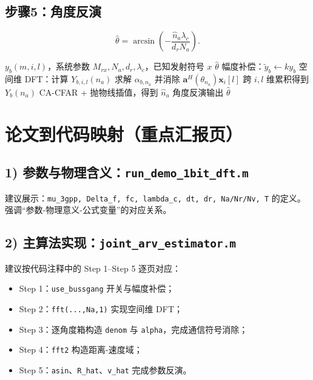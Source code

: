 \documentclass[12pt,a4paper]{ctexart}
\begin{document}
\subsection{步骤5：角度反演}
\begin{equation}
  \hat\theta = \arcsin\!\left(-\frac{\hat n_a\lambda_c}{d_r N_a}\right).
\end{equation}

\begin{algorithm}[H]
\caption{单比特空间维 DFT 角度估计流程}
\begin{algorithmic}[1]
\Require $y_b(m,i,l)$，系统参数 $M_{rx},N_a,d_r,\lambda_c$，已知发射符号 $x$
\Ensure $\hat\theta$
\State 幅度补偿：$\tilde y_b \leftarrow k y_b$
\State 空间维 DFT：计算 $Y_{b,i,l}(n_a)$
\State 求解 $\alpha_{b,n_a}$ 并消除 $\mathbf{a}^H(\theta_{n_a})\mathbf{x}_i[l]$
\State 跨 $i,l$ 维累积得到 $Y_b(n_a)$
\State CA-CFAR + 抛物线插值，得到 $\hat n_a$
\State 角度反演输出 $\hat\theta$
\end{algorithmic}
\end{algorithm}

\section{论文到代码映射（重点汇报页）}
\subsection*{1) 参数与物理含义：\texttt{run\_demo\_1bit\_dft.m}}
建议展示：\texttt{mu\_3gpp, Delta\_f, fc, lambda\_c, dt, dr, Na/Nr/Nv, T} 的定义。强调“参数-物理意义-公式变量”的对应关系。

\subsection*{2) 主算法实现：\texttt{joint\_arv\_estimator.m}}
建议按代码注释中的 Step 1--Step 5 逐页对应：
\begin{itemize}
  \item Step 1：\texttt{use\_bussgang} 开关与幅度补偿；
  \item Step 2：\texttt{fft(...,Na,1)} 实现空间维 DFT；
  \item Step 3：逐角度箱构造 \texttt{denom} 与 \texttt{alpha}，完成通信符号消除；
  \item Step 4：\texttt{fft2} 构造距离-速度域；
  \item Step 5：\texttt{asin}、\texttt{R\_hat}、\texttt{v\_hat} 完成参数反演。
\end{itemize}
\end{document}
